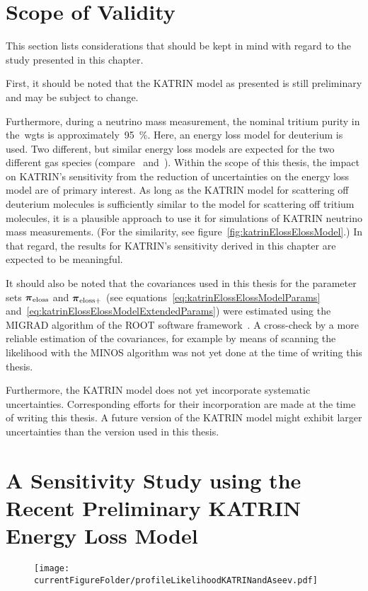 \section{Scope of Validity}
\label{sec:katrinElossValidity}
This section lists considerations that should be kept in mind with regard to the study presented in this chapter.

First, it should be noted that the KATRIN model as presented is still preliminary and may be subject to change.

Furthermore, during a neutrino mass measurement, the nominal tritium purity in the~\gls{wgts} is approximately~\SI{95}{\percent}. Here, an energy loss model for deuterium is used. Two different, but similar energy loss models are expected for the two different gas species (compare~\cite{Abdurashitov2017} and~\cite{Aseev2000}). Within the scope of this thesis, the impact on KATRIN's sensitivity from the reduction of uncertainties on the energy loss model are of primary interest. As long as the KATRIN model for scattering off deuterium molecules is sufficiently similar to the model for scattering off tritium molecules, it is a plausible approach to use it for simulations of KATRIN neutrino mass measurements. (For the similarity, see figure~\ref{fig:katrinElossElossModel}.) In that regard, the results for KATRIN's sensitivity derived in this chapter are expected to be meaningful.

It should also be noted that the covariances used in this thesis for the parameter sets $\boldsymbol{\mathbf{\pi}}_\mathrm{eloss}$ and $\boldsymbol{\mathbf{\pi}}_\mathrm{eloss+}$ (see equations~\ref{eq:katrinElossElossModelParams} and~\ref{eq:katrinElossElossModelExtendedParams}) were estimated using the MIGRAD algorithm of the ROOT software framework~\cite{Hannen2019_1}. A cross-check by a more reliable estimation of the covariances, for example by means of scanning the likelihood with the MINOS algorithm was not yet done at the time of writing this thesis.

Furthermore, the KATRIN model does not yet incorporate systematic uncertainties. Corresponding efforts for their incorporation are made at the time of writing this thesis. A future version of the KATRIN model might exhibit larger uncertainties than the version used in this thesis.



\section{A Sensitivity Study using the Recent Preliminary KATRIN Energy Loss Model}
\label{sec:katrinElossModelResults}
\def\currentRootFolder{chapter/sensitivityStudyWithPreliminaryKatrinElossModel}
\def\currentFigureFolder{\currentRootFolder/fig}
\begin{figure}[th]
	\centering
	\texttt{[image: \\currentFigureFolder/profileLikelihoodKATRINandAseev.pdf]}
	\xcaption{}{}{}
	\label{fig:katrinElossResultsProfileLikelihood}
\end{figure}

